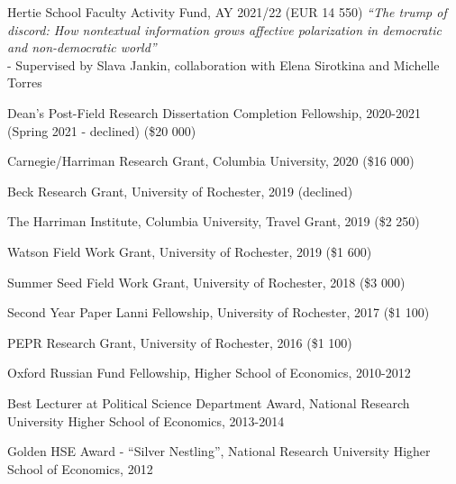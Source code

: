 \documentclass[margin,line,11pt]{res}
\begin{document}
\begin{resume}
\vspace*{-3.5mm}

Hertie School Faculty Activity Fund, AY 2021/22 (EUR 14 550) \textit{“The trump of discord: How nontextual information grows affective polarization in democratic and non-democratic world”} 
\\
- Supervised by Slava Jankin, collaboration with Elena Sirotkina and Michelle Torres
\\

\vspace*{-4.5mm}

Dean's Post-Field Research Dissertation Completion Fellowship, 2020-2021 (Spring 2021 - declined) (\$20 000)
\vspace*{-4.5mm}

Carnegie/Harriman Research Grant, Columbia University, 2020 (\$16 000)
\vspace*{-4.5mm}

Beck Research Grant, University of Rochester, 2019 (declined)
\vspace*{-4.5mm}

The Harriman Institute, Columbia University, Travel Grant, 2019 (\$2 250)
\vspace*{-4.5mm}

Watson Field Work Grant, University of Rochester, 2019 (\$1 600)
\vspace*{-4.5mm}

Summer Seed Field Work Grant, University of Rochester, 2018 (\$3 000)
\vspace*{-4.5mm}

Second Year Paper Lanni Fellowship, University of Rochester, 2017 (\$1 100)
\vspace*{-4.5mm}

PEPR Research Grant, University of Rochester, 2016 (\$1 100)
\vspace*{-4.5mm}


Oxford Russian Fund Fellowship, Higher School of Economics, 2010-2012 
\vspace*{-2.5mm}

Best Lecturer at Political Science Department Award, National Research University Higher School of Economics, 2013-2014 
\vspace*{-4.5mm}

Golden HSE Award - ``Silver Nestling'', National Research University Higher School of Economics, 2012
\vspace*{-2.5mm}



\end{resume}
\end{document}
